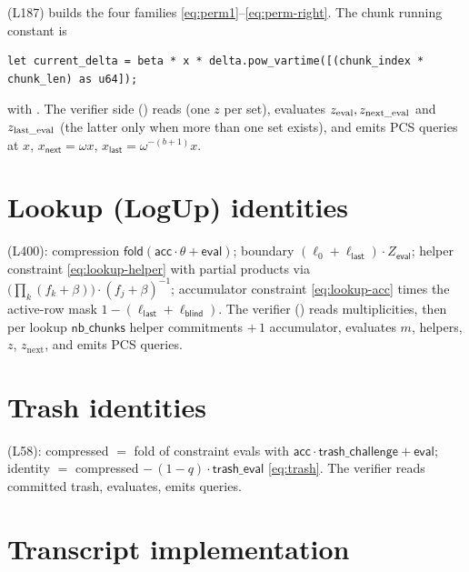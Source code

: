  (L187) builds the four families
\eqref{eq:perm1}--\eqref{eq:perm-right}. The chunk running constant is
\begin{lstlisting}[style=rust]
let current_delta = beta * x * delta.pow_vartime([(chunk_index * chunk_len) as u64]);
\end{lstlisting}
with . The verifier side
() reads 
(one $z$ per set), evaluates $z_{\text{eval}}, z_{\text{next\_\allowbreak{}eval}}$ and
$z_{\text{last\_\allowbreak{}eval}}$ (the latter only when more than one set exists),
and emits PCS queries at $x$, $x_{\mathsf{next}} = \omega x$,
$x_{\mathsf{last}} = \omega^{-(b+1)}x$.

\section{Lookup (LogUp) identities}
\label{sec:rust-lookup}

 (L400): compression
$\mathsf{fold}(\mathsf{acc}\cdot\theta + \mathsf{eval})$; boundary
$(\ell_0 + \ell_{\mathsf{last}})\cdot Z_{\mathsf{eval}}$; helper
constraint \eqref{eq:lookup-helper} with partial products via
$\bigl(\prod_k (f_k+\beta)\bigr)\cdot(f_j+\beta)^{-1}$; accumulator
constraint \eqref{eq:lookup-acc} times the active-row mask
$1-(\ell_{\mathsf{last}}+\ell_{\mathsf{blind}})$. The verifier
() reads multiplicities, then per lookup
$\mathsf{nb\_\allowbreak{}chunks}$ helper commitments $+\,1$ accumulator, evaluates
$m$, helpers, $z$, $z_{\text{next}}$, and emits PCS queries.

\section{Trash identities}
\label{sec:rust-trash}

 (L58): compressed $=$ fold of constraint
evals with $\mathsf{acc}\cdot\mathsf{trash\_\allowbreak{}challenge} + \mathsf{eval}$;
identity $=$ compressed $-\,(1-q)\cdot\mathsf{trash\_\allowbreak{}eval}$
\eqref{eq:trash}. The verifier reads committed trash, evaluates, emits
queries.

\section{Transcript implementation}
\label{sec:rust-transcript}

